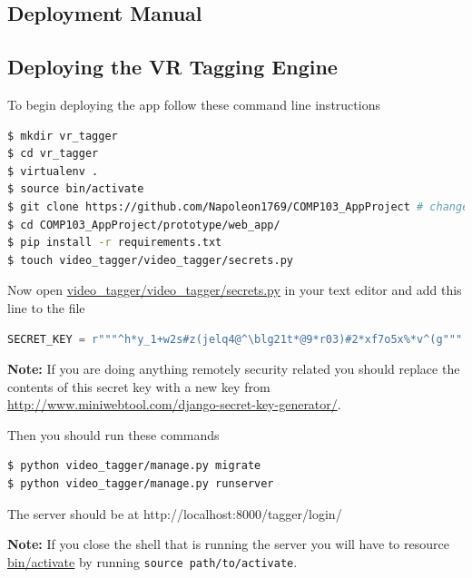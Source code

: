 \documentclass[12pt]{report}
\newcommand{\inlinecode}{\texttt}
\begin{document}
\begin{appendices}

    \chapter{Deployment Manual}
    \section{Deploying the VR Tagging Engine}
    To begin deploying the app follow these command line instructions
    \begin{lstlisting}[language=bash, breaklines]
$ mkdir vr_tagger
$ cd vr_tagger
$ virtualenv .
$ source bin/activate
$ git clone https://github.com/Napoleon1769/COMP103_AppProject # change the URL as needed
$ cd COMP103_AppProject/prototype/web_app/
$ pip install -r requirements.txt
$ touch video_tagger/video_tagger/secrets.py
    \end{lstlisting}
    Now open \url{video_tagger/video_tagger/secrets.py} in your text editor and add this line to the file
    \begin{lstlisting}[language=python, breaklines]
SECRET_KEY = r"""^h*y_1+w2s#z(jelq4@^\blg21t*@9*r03)#2*xf7o5x%*v^(g"""
    \end{lstlisting}
    {\bf Note:} If you are doing anything remotely security related you should
    replace the contents of this secret key with a new key from
    \url{http://www.miniwebtool.com/django-secret-key-generator/}.

    Then you should run these commands 

    \begin{lstlisting}[language=bash, breaklines]
$ python video_tagger/manage.py migrate
$ python video_tagger/manage.py runserver 
    \end{lstlisting}
    The server should be at http://localhost:8000/tagger/login/
    
    {\bf Note:} If you close the shell that is running the server you will have to resource \url{bin/activate} by running \inlinecode{source path/to/activate}.


\end{appendices}
\end{document}
